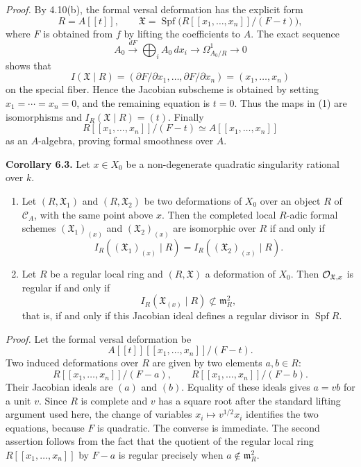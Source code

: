\documentclass[11pt]{article}
\providecommand{\Spf}{\operatorname{Spf}}
\begin{document}
\emph{Proof.}  By 4.10(b), the formal versal deformation has the explicit form
\[
        R=A[[t]],\qquad
        \mathfrak X=
        \Spf\bigl(R[[x_1,\ldots,x_n]]/(F-t)\bigr),
\]
where \(F\) is obtained from \(f\) by lifting the coefficients to \(A\).  The exact sequence
\[
        A_0\xrightarrow{dF}
        \bigoplus_i A_0\,dx_i
        \longrightarrow
        \Omega^1_{A_0/R}
        \longrightarrow 0
\]
shows that
\[
        I(\mathfrak X\mid R)=(\partial F/\partial x_1,\ldots,\partial F/\partial x_n)
        =(x_1,\ldots,x_n)
\]
on the special fiber.  Hence the Jacobian subscheme is obtained by setting \(x_1=\cdots=x_n=0\), and the remaining equation is \(t=0\).  Thus the maps in (1) are isomorphisms and \(I_R(\mathfrak X\mid R)=(t)\).  Finally
\[
        R[[x_1,\ldots,x_n]]/(F-t)
        \simeq
        A[[x_1,\ldots,x_n]]
\]
as an \(A\)-algebra, proving formal smoothness over \(A\).

\textbf{Corollary 6.3.}  Let \(x\in X_0\) be a non-degenerate quadratic singularity rational over \(k\).
\begin{enumerate}[label=(\arabic*)]
\item Let \((R,\mathfrak X_1)\) and \((R,\mathfrak X_2)\) be two deformations of \(X_0\) over an object \(R\) of \(\mathcal C_A\), with the same point above \(x\).  Then the completed local \(R\)-adic formal schemes \((\mathfrak X_1)_{(x)}\) and \((\mathfrak X_2)_{(x)}\) are isomorphic over \(R\) if and only if
\[
        I_R((\mathfrak X_1)_{(x)}\mid R)
        =
        I_R((\mathfrak X_2)_{(x)}\mid R).
\]
\item Let \(R\) be a regular local ring and \((R,\mathfrak X)\) a deformation of \(X_0\).  Then \(\mathcal O_{\mathfrak X,x}\) is regular if and only if
\[
        I_R(\mathfrak X_{(x)}\mid R)\not\subset \mathfrak m_R^2,
\]
that is, if and only if this Jacobian ideal defines a regular divisor in \(\Spf R\).
\end{enumerate}

\emph{Proof.}  Let the formal versal deformation be
\[
        A[[t]][[x_1,\ldots,x_n]]/(F-t).
\]
Two induced deformations over \(R\) are given by two elements \(a,b\in R\):
\[
        R[[x_1,\ldots,x_n]]/(F-a),
        \qquad
        R[[x_1,\ldots,x_n]]/(F-b).
\]
Their Jacobian ideals are \((a)\) and \((b)\).  Equality of these ideals gives \(a=vb\) for a unit \(v\).  Since \(R\) is complete and \(v\) has a square root after the standard lifting argument used here, the change of variables \(x_i\mapsto v^{1/2}x_i\) identifies the two equations, because \(F\) is quadratic.  The converse is immediate.  The second assertion follows from the fact that the quotient of the regular local ring \(R[[x_1,\ldots,x_n]]\) by \(F-a\) is regular precisely when \(a\notin\mathfrak m_R^2\).
\end{document}

